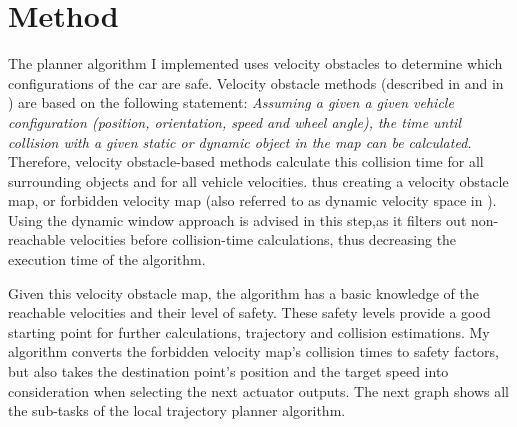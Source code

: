 \section{Method}

The planner algorithm I implemented uses velocity obstacles to determine which configurations of the car are safe. Velocity obstacle methods (described in \cite{VelocityForbiddenMap} and in \citep{VelocityObstacles}) are based on the following statement: \textit{Assuming a given a given vehicle configuration (position, orientation, speed and wheel angle), the time until collision with a given static or dynamic object in the map can be calculated.} Therefore, velocity obstacle-based methods calculate this collision time for all surrounding objects and for all vehicle velocities. thus creating a velocity obstacle map, or forbidden velocity map (also referred to as dynamic velocity space in \cite{DynamicMotionPlanningSurvey}). Using the dynamic window approach is advised in this step,as it filters out non-reachable velocities before collision-time calculations, thus decreasing the execution time of the algorithm.

Given this velocity obstacle map, the algorithm has a basic knowledge of the reachable velocities and their level of safety. These safety levels provide a good starting point for further calculations, trajectory and collision estimations. My algorithm converts the forbidden velocity map's collision times to safety factors, but also takes the destination point's position and the target speed into consideration when selecting the next actuator outputs. The next graph shows all the sub-tasks of the local trajectory planner algorithm.


